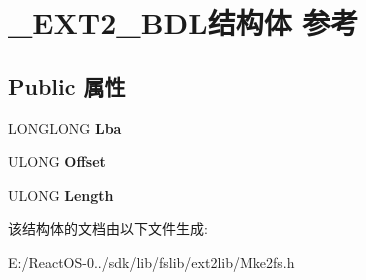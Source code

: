 \hypertarget{struct___e_x_t2___b_d_l}{}\section{\+\_\+\+E\+X\+T2\+\_\+\+B\+D\+L结构体 参考}
\label{struct___e_x_t2___b_d_l}
\subsection*{Public 属性}
\begin{DoxyCompactItemize}
\item 
\mbox{\label{struct___e_x_t2___b_d_l_a3757e3b320ac7c0427686aae7361573c}} 
L\+O\+N\+G\+L\+O\+NG {\bfseries Lba}
\item 
\mbox{\label{struct___e_x_t2___b_d_l_a21db1d761451d9568f3ec328c18b6230}} 
U\+L\+O\+NG {\bfseries Offset}
\item 
\mbox{\label{struct___e_x_t2___b_d_l_a0d0f356857e1e3b8f775e7426c990c53}} 
U\+L\+O\+NG {\bfseries Length}
\end{DoxyCompactItemize}


该结构体的文档由以下文件生成\+:\begin{DoxyCompactItemize}
\item 
E\+:/\+React\+O\+S-\/0../sdk/lib/fslib/ext2lib/Mke2fs.\+h\end{DoxyCompactItemize}
